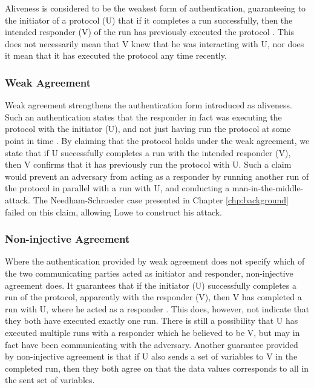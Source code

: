 Aliveness is considered to be the weakest form of authentication, guaranteeing to the initiator of a protocol (U) that if it completes a run successfully, then the intended responder (V) of the run has previously executed the protocol \cite{lowe1997hierarchy}. This does not necessarily mean that V knew that he was interacting with U, nor does it mean that it has executed the protocol any time recently. 


\subsubsection{Weak Agreement}

Weak agreement strengthens the authentication form introduced as aliveness. Such an authentication states that the responder in fact was executing the protocol with the initiator (U), and not just having run the protocol at some point in time \cite{lowe1997hierarchy}. By claiming that the protocol holds under the weak agreement, we state that if U successfully completes a run with the intended responder (V), then V confirms that it has previously run the protocol with U. Such a claim would prevent an adversary from acting as a responder by running another run of the protocol in parallel with a run with U, and conducting a man-in-the-middle-attack. The Needham-Schroeder case presented in Chapter \ref{chp:background} failed on this claim, allowing Lowe to construct his attack. 


\subsubsection{Non-injective Agreement}

Where the authentication provided by weak agreement does not specify which of the two communicating parties acted as initiator and responder, non-injective agreement does. It guarantees that if the initiator (U) successfully completes a run of the protocol, apparently with the responder (V), then V has completed a run with U, where he acted as a responder \cite{lowe1997hierarchy}. This does, however, not indicate that they both have executed exactly one run. There is still a possibility that U has executed multiple runs with a responder which he believed to be V, but may in fact have been communicating with the adversary. Another guarantee provided by non-injective agreement is that if U also sends a set of variables to V in the completed run, then they both agree on that the data values corresponds to all in the sent set of variables.

